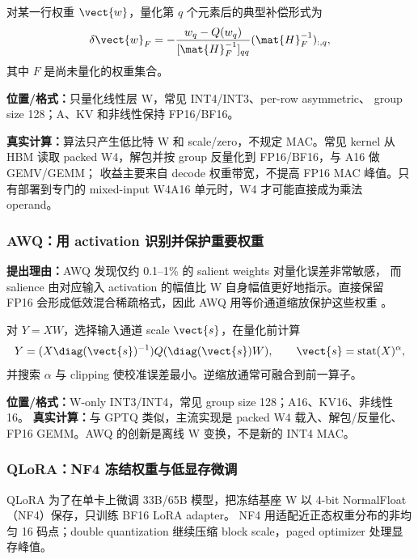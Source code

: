 对某一行权重 $\vect{w}$，量化第 $q$ 个元素后的典型补偿形式为
\begin{equation}
  \delta\vect{w}_{F}
  =-\frac{w_q-Q(w_q)}{[\mat{H}^{-1}_{F}]_{qq}}
    (\mat{H}^{-1}_{F})_{:,q},
  \label{eq:gptq-compensation}
\end{equation}
其中 $F$ 是尚未量化的权重集合。

\textbf{位置/格式：}只量化线性层 W，常见 INT4/INT3、per-row asymmetric、
group size 128；A、KV 和非线性保持 FP16/BF16。

\textbf{真实计算：}算法只产生低比特 W 和 scale/zero，不规定 MAC。常见 kernel
从 HBM 读取 packed W4，解包并按 group 反量化到 FP16/BF16，与 A16 做 GEMV/GEMM；
收益主要来自 decode 权重带宽，不提高 FP16 MAC 峰值。只有部署到专门的 mixed-input
W4A16 单元时，W4 才可能直接成为乘法 operand。

\subsubsection{AWQ：用 activation 识别并保护重要权重}

\textbf{提出理由：}AWQ 发现仅约 0.1--1\% 的 salient weights 对量化误差非常敏感，
而 salience 由对应输入 activation 的幅值比 W 自身幅值更好地指示。直接保留 FP16
会形成低效混合稀疏格式，因此 AWQ 用等价通道缩放保护这些权重
。

对 $Y=XW$，选择输入通道 scale $\vect{s}$，在量化前计算
\begin{equation}
  Y=(X\diag(\vect{s})^{-1})
    Q(\diag(\vect{s})W),
  \qquad
  \vect{s}=\operatorname{stat}(X)^{\alpha},
  \label{eq:awq-scaling}
\end{equation}
并搜索 $\alpha$ 与 clipping 使校准误差最小。逆缩放通常可融合到前一算子。

\textbf{位置/格式：}W-only INT3/INT4，常见 group size 128；A16、KV16、非线性16。
\textbf{真实计算：}与 GPTQ 类似，主流实现是 packed W4 载入、解包/反量化、FP16
GEMM。AWQ 的创新是离线 W 变换，不是新的 INT4 MAC。

\subsubsection{QLoRA：NF4 冻结权重与低显存微调}

QLoRA 为了在单卡上微调 33B/65B 模型，把冻结基座 W 以 4-bit NormalFloat
（NF4）保存，只训练 BF16 LoRA adapter。
NF4 用适配近正态权重分布的非均匀 16 码点；double quantization 继续压缩 block
scale，paged optimizer 处理显存峰值。

